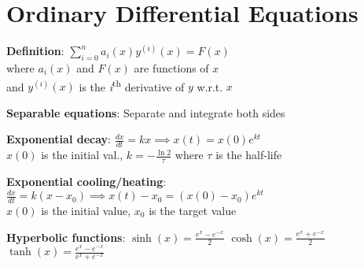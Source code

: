 \documentclass[a4paper,landscape]{article}
\newcommand{\rntopic}[1]{\section*{#1}\vspace{-0.7em}}
\newcommand{\rnname}[1]{\textbf{#1}}
\begin{document}
\begin{multicols*}{3}
\begin{flatitemize}
\end{flatitemize}


\rntopic{Ordinary Differential Equations}

\begin{flatitemize}

\item \rnname{Definition}: $\displaystyle \sum_{i=0}^{n}a_i(x)y^{(i)}(x) = F(x)$ \\ where $a_i(x)$ and $F(x)$ are functions of $x$ \\ and $y^{(i)}(x)$ is the \textit{i}\textsuperscript{th} derivative of $y$ w.r.t. $x$

\item \rnname{Separable equations}: Separate and integrate both sides

\item \rnname{Exponential decay}: $\displaystyle\frac{dx}{dt}=kx \implies x(t) = x(0)e^{kt}$ \\ $\displaystyle x(0)$ is the initial val., $\displaystyle k=-\frac{\ln 2}{\tau}$ where $\tau$ is the half-life

\item \rnname{Exponential cooling/heating}: $\displaystyle\frac{dx}{dt}=k(x-x_0) \implies x(t)-x_0 = \left(x(0)-x_0\right)e^{kt}$ \\ $\displaystyle x(0)$ is the initial value, $\displaystyle x_0$ is the target value


\item \rnname{Hyperbolic functions}: $\displaystyle\sinh(x)=\frac{e^x-e^{-x}}{2}$
$\displaystyle\cosh(x)=\frac{e^x+e^{-x}}{2}$ \hspace{1.6em} $\displaystyle\tanh(x)=\frac{e^x-e^{-x}}{e^x+e^{-x}}$




\end{flatitemize}
\end{multicols*}
\end{document}
